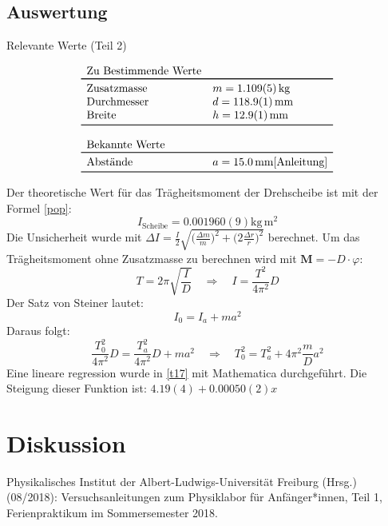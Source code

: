 \documentclass[11pt,a4paper]{article}
\renewcommand{\vec}{\boldsymbol}
\begin{document}
\subsection{Auswertung}

\begin{table}[ht]
\caption{Relevante Werte (Teil 2)}
$$
\begin{array}{ll}
	\multicolumn{1}{l}{\textrm{Zu Bestimmende Werte}} \\
	\toprule 
	\textrm{Zusatzmasse} & m = 1.109(5)\,\textrm{kg} \\
	\textrm{Durchmesser} & d = 118.9(1)\,\textrm{mm} \\
	\textrm{Breite} & h = 12.9(1)\,\textrm{mm} \\
	\bottomrule \\
	\multicolumn{2}{l}{\textrm{Bekannte Werte}} \\
	\toprule
	\textrm{Abstände} & a = 15.0\,\textrm{mm}\cite{Anleitung}\\
	\bottomrule 
\end{array}
$$
\end{table}

Der theoretische Wert für das Trägheitsmoment der Drehscheibe ist mit der Formel \ref{pop}:
$$I_{\textrm{Scheibe}} = 0.001960(9)\textrm{kg}\,\textrm{m}^2$$
Die Unsicherheit wurde mit $\Delta I = \frac{I}{2}\sqrt{\bigg(\frac{\Delta m}{m}\bigg)^2 + \bigg(2\frac{\Delta r}{r}\bigg)^2}$ berechnet. 
Um das Trägheitsmoment ohne Zusatzmasse zu berechnen wird mit $\vec M = -D\cdot \varphi$:
$$T = 2\pi \sqrt{\frac{I}{D}}\quad \Rightarrow \quad I = \frac{T^2}{4\pi^2}D$$
Der Satz von Steiner lautet:
$$I_0 = I_a + ma^2$$
Daraus folgt:
$$\frac{T_0^2}{4\pi^2}D = \frac{T_a^2}{4\pi^2}D + ma^2 \quad \Rightarrow \quad T_0^2 = T_a^2 + 4\pi^2 \frac{m}{D}a^2$$
Eine lineare regression wurde in \ref{t17} mit Mathematica durchgeführt. Die Steigung dieser Funktion ist: $4.19(4) + 0.00050(2) x$ 



\section{Diskussion}

\vfill

\begin{thebibliography}{9}
  Physikalisches Institut der Albert-Ludwigs-Universität Freiburg (Hrsg.) (08/2018): Versuchsanleitungen zum Physiklabor für Anfänger*innen, Teil 1, Ferienpraktikum im Sommersemester 2018.
 \end{thebibliography}
\end{document}
